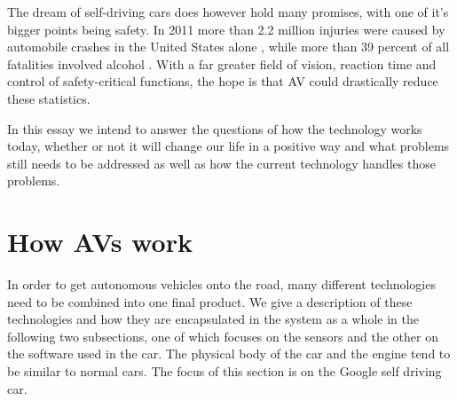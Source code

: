 \documentclass[11pt]{article}
\begin{document}
The dream of self-driving cars does however hold many promises, with one of it's bigger points being safety. In 2011 more than 2.2 million injuries were caused by automobile crashes in the United States alone \cite[p. 14]{Anderson2014rand}, while more than 39 percent of all fatalities involved alcohol \cite[p. 16]{Anderson2014rand}. With a far greater field of vision, reaction time and control of safety-critical functions, the hope is that AV could drastically reduce these statistics. 

In this essay we intend to answer the questions of how the technology works today, whether or not it will change our life in a positive way and what problems still needs to be addressed as well as how the current technology handles those problems.

\section{How AVs work}
\label{sec:howavswork}
In order to get autonomous vehicles onto the road, many different technologies need to be combined into one final product. We give a description of these technologies and how they are encapsulated in the system as a whole in the following two subsections, one of which focuses on the sensors and the other on the software used in the car. The physical body of the car and the engine tend to be similar to normal cars. The focus of this section is on the Google self driving car.
\end{document}
